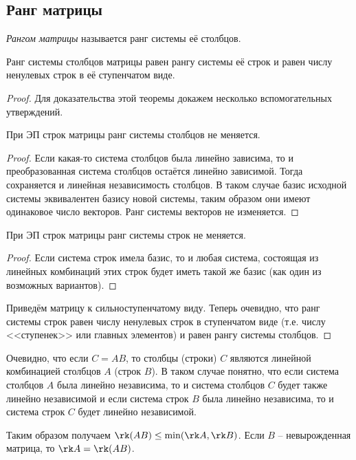 \newpage
\subsection{Ранг матрицы}

\begin{df}
  \emph{Рангом матрицы} называется ранг системы её столбцов.
\end{df}

\begin{theorem}
  Ранг системы столбцов матрицы равен рангу системы её строк и равен числу ненулевых строк в её ступенчатом виде.
\end{theorem}

\begin{proof}
  Для доказательства этой теоремы докажем несколько вспомогательных утверждений.
  
  \begin{lemma}
    При ЭП строк матрицы ранг системы столбцов не меняется.
  \end{lemma}
  \begin{proof}
    Если какая-то система столбцов была линейно зависима, то и преобразованная система столбцов остаётся линейно зависимой. Тогда сохраняется и линейная независимость столбцов. В таком случае базис исходной системы эквивалентен базису новой системы, таким образом они имеют одинаковое число векторов. Ранг системы векторов не изменяется.
  \end{proof}

  \begin{lemma}
    При ЭП строк матрицы ранг системы строк не меняется.
  \end{lemma}

  \begin{proof}
    Если система строк имела базис, то и любая система, состоящая из линейных комбинаций этих строк будет иметь такой же базис (как один из возможных вариантов).
  \end{proof}

  
  Приведём матрицу к сильноступенчатому виду. Теперь очевидно, что ранг системы строк равен числу ненулевых строк в ступенчатом виде (т.е. числу <<ступенек>> или главных элементов) и равен рангу системы столбцов.
\end{proof}

Очевидно, что если $C=AB$, то столбцы (строки) $C$ являются линейной комбинацией столбцов $A$ (строк $B$). В таком случае понятно, что если система столбцов $A$ была линейно независима, то и система столбцов $C$ будет также линейно независимой и если система строк $B$ была линейно независима, то и система строк $C$ будет линейно независимой.

Таким образом получаем $\rk (AB)\le\min(\rk A, \rk B)$. Если $B$ -- невырожденная матрица, то $\rk A=\rk (AB)$.

